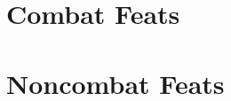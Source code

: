 \documentclass[././main.tex]{subfiles}
\begin{document}
\chapter{Combat Feats}

\chapter{Noncombat Feats}

\end{document}
